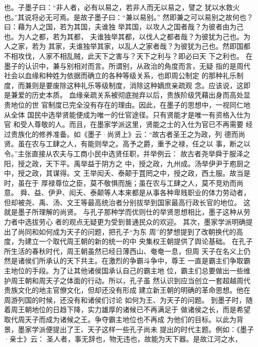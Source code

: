 \documentclass[12pt,UTF8]{ctexbook}
\begin{document}
也。子墨子曰：“非人者，必有以易之，若非人而无以易之，譬之 
犹以水救火也。”其说将必无可焉。是故子墨子曰：“兼以易别。” 
然即兼之可以易别之故何也？曰：藉为人之国，若为其国，夫谁独 
举其国，以攻人之国者哉？为彼者由为己也。为人之都，若为其都， 
夫谁独举其都，以伐人之都者哉？为彼犹为己也。为人之家，若为 
其家，夫谁独举其家，以乱人之家者哉？为彼犹为己也。然即国都 
不相攻伐，人家不相乱贼，此天下之害与？天下之利与？即必曰天 
下之利也。 
在墨子的认识中，兼与别相对而言。所谓别，从政治的角度而言，无疑 
指的是周代社会以血缘和种姓为依据而确立的各种等级关系，也即周公制定 
的那种礼乐制度，而兼则是要废除这种礼乐等级制度，消除这种嫡庶亲疏观 
念。应该说，这即是兼爱的历史本质。 
血缘亲疏关系被彻底抛弃以后，贵族阶级凭藉出身而高处显贵地位的世 
官制度已完全没有存在的理由。因此，在墨子的思想中，一视同仁地从全体 
国民中选举贤能便成为唯一的仕官途径。只有贤能才是唯一有资格入仕为官 
和受人尊敬的人。而且，在墨家学派这里，贤能之士的入仕为官已不再需要 
经过贵族化的修养准备。如《墨子·尚贤上》云：“故古者圣王之为政，列 
德而尚贤。虽在农与工肆之人，有能则举之。高予之爵，重予之禄，任之以 
事，断之以令。”主张直接从农夫与工商小民中选贤任职，并举例云： 
故古者尧举舜于服泽之阳，授之政，天下平。禹举益于阴方之 
中，授之政，九州成。汤举伊尹于庖厨之中，授之政，其谋得。文 
王举闳夭、泰颠于罝罔之中，授之政，西土服。故当是时，虽在于 
厚禄尊位之臣，莫不敬惧而施；虽在农与工肆之人，莫不竞劝而尚 
意。 
舜、益、伊尹、闳夭、泰颠等人本来都是从事各种卑贱职业的体力劳动者， 
但却被尧、禹、汤、文王等最高统治者分别拔举到国家最高行政长官的地位。 
这就是墨子所理解的尚贤。 
与孔子那种学而优则仕的举贤思想相比，墨子这种从劳力者中选拔劳心 
者的观点无疑更为受到普通民众的欢迎。 
其次，墨家学派明确提出了尚同和如何成为天子的问题，把孔子“为东 
周”的梦想提到了改朝换代的高度，为建立一个取代周王朝的新的统一的中 
央集权王朝提供了舆论基础。 
在孔子所生活的春秋时代，周王朝虽然已经日薄西山、奄奄一息，但周 
天子在名义上仍然是诸侯们所承认的天下共主。在激烈的争霸斗争中，尊王 
一直是霸主们争取霸主地位的手段。为了让其他诸侯国承认自己的霸主地 
位，霸主们总要做出一些维护周王朝和周天子之体面的行动。所以，孔子虽 
然认识到应当创立一套超越周代贵族文化的地主官僚文化，但却还没有形成 
建立新王朝的明确的革命思想。他在周游列国的时候，还没有和诸侯们讨论 
如何为王、为天子的问题。 
到墨子时，随着周王朝地位的日趋下降，实力雄厚的诸候已不再满足于 
做诸侯之长，而是希望取代周天子而成为诸候之王。争夺霸主地位也不再成 
为他们的目标。以此为背景，墨家学派便提出了王、天子这样一些孔子尚未 
提出的时代主题。例如：《墨子·亲士》云： 
圣人者，事无辞也，物无违也，故能为天下器。是故江河之水， 
\end{document}
